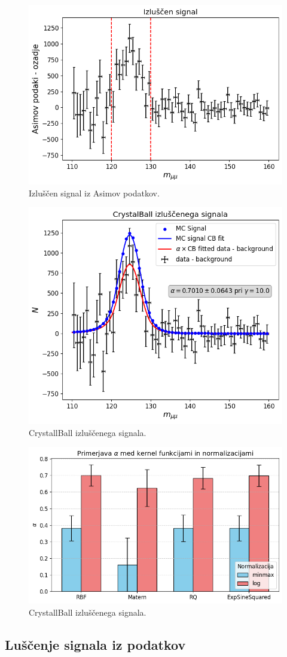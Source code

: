 \documentclass[slovene,11pt,a4paper]{article}
\begin{document}
\begin{figure}[h!]
    \centering
    \includegraphics[width=0.8\linewidth]{imgs/IzluscenSignalAsimovData_GPR.png}
    \caption{Izluščen signal iz Asimov podatkov.}
    \label{fig:IzluscenSignalAsimovData_GPR}
\end{figure}

\begin{figure}[h!]
    \centering
    \includegraphics[width=0.8\linewidth]{imgs/CrystallBall_izluscenega_signala.png}
    \caption{CrystallBall izluščenega signala.}
    \label{fig:CrystallBall_izluscenega_signala}
\end{figure}

\begin{figure}[h!]
    \centering
    \includegraphics[width=0.8\linewidth]{imgs/alphas.png}
    \caption{CrystallBall izluščenega signala.}
    \label{fig:alphas}
\end{figure}

\subsection{Luščenje signala iz podatkov}
\end{document}
